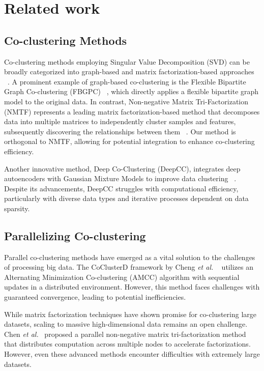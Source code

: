 \documentclass[journal]{IEEEtran}
\renewcommand{\cite}[1]{~\autocite{#1}}
\begin{document}
\section{Related work}
\label{sec:related_work}
\subsection{Co-clustering Methods}
Co-clustering methods employing Singular Value Decomposition (SVD) can be broadly categorized into graph-based and matrix factorization-based approaches
\cite{dhillon2001CoclusteringDocumentsWords}. A prominent example of graph-based co-clustering is the Flexible Bipartite Graph Co-clustering (FBGPC) \cite{chen2023FastFlexibleBipartitea}, which directly applies a flexible bipartite graph model to the original data. In contrast, Non-negative Matrix Tri-Factorization (NMTF) represents a leading matrix factorization-based method that decomposes data into multiple matrices to independently cluster samples and features, subsequently discovering the relationships between them \cite{long2005CoclusteringBlockValue}. Our method is orthogonal to NMTF, allowing for potential integration to enhance co-clustering efficiency.

Another innovative method, Deep Co-Clustering (DeepCC), integrates deep autoencoders with Gaussian Mixture Models to improve data clustering \cite{dongkuanxu2019DeepCoClustering}. Despite its advancements, DeepCC struggles with computational efficiency, particularly with diverse data types and iterative processes dependent on data sparsity.

\subsection{Parallelizing Co-clustering}

Parallel co-clustering methods have emerged as a vital solution to the challenges of processing big data. The CoClusterD framework by Cheng \textit{et al.} \cite{cheng2015CoClusterDDistributedFramework} utilizes an Alternating Minimization Co-clustering (AMCC) algorithm with sequential updates in a distributed environment. However, this method faces challenges with guaranteed convergence, leading to potential inefficiencies.

While matrix factorization techniques have shown promise for co-clustering large datasets, scaling to massive high-dimensional data remains an open challenge. Chen \textit{et al.}\cite{chen2023ParallelNonNegativeMatrix} proposed a parallel non-negative matrix tri-factorization method that distributes computation across multiple nodes to accelerate factorizations. However, even these advanced methods encounter difficulties with extremely large datasets.
\end{document}
